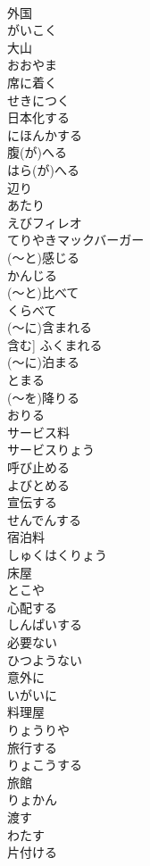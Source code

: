 \documentclass[8pt]{extreport}
\begin{document}
\begin{CJK}{UTF8}{min}
\\	外国	
\\	がいこく
\\	大山	
\\	おおやま
\\	席に着く	
\\	せきにつく
\\	日本化する	
\\	にほんかする
\\	腹(が)へる	
\\	はら(が)へる
\\	辺り	
\\	あたり
\\	えびフィレオ	
\\	てりやきマックバーガー	
\\	(～と)感じる	
\\	かんじる
\\	(～と)比べて	
\\	くらべて
\\	(～に)含まれる	
\\	含む]	ふくまれる
\\	(～に)泊まる	
\\	とまる
\\	(～を)降りる	
\\	おりる
\\	サービス料	
\\	サービスりょう
\\	呼び止める	
\\	よびとめる
\\	宣伝する	
\\	せんでんする
\\	宿泊料	
\\	しゅくはくりょう
\\	床屋	
\\	とこや
\\	心配する	
\\	しんぱいする
\\	必要ない	
\\	ひつようない
\\	意外に	
\\	いがいに
\\	料理屋	
\\	りょうりや
\\	旅行する	
\\	りょこうする
\\	旅館	
\\	りょかん
\\	渡す	
\\	わたす
\\	片付ける	

\end{CJK}
\end{document}
